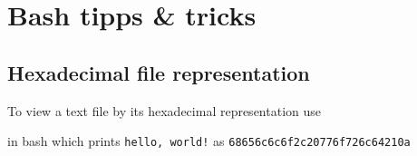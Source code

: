 \newpage
\section{Bash tipps \& tricks}
	\subsection{Hexadecimal file representation}
		To view a text file by its hexadecimal representation use
		
		in bash which prints \lstinline{hello, world!} as
		\lstinline{68656c6c6f2c20776f726c64210a}

